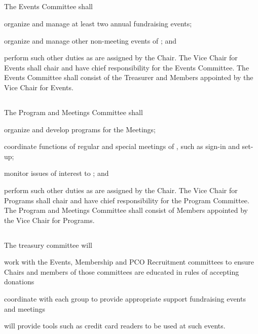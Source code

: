 \subsection{} \label{events-committee}
The Events Committee shall
\begin{inlinealphalist}
    \item organize and manage at least two annual fundraising events;
    \item organize and manage other non-meeting events of \thedistrict{}; and
    \item perform such other duties as are assigned by the Chair. The Vice Chair for Events shall chair and have chief responsibility for the Events Committee. The Events Committee shall consist of the Treasurer and Members appointed by the Vice Chair for Events.
\end{inlinealphalist}

\subsection{} \label{meetings-committee}
The Program and Meetings Committee shall
\begin{inlinealphalist}
    \item organize and develop programs for the Meetings;
    \item coordinate functions of regular and special meetings of \thedistrict{}, such as sign-in and set-up;
    \item monitor issues of interest to \thedistrict{}; and
    \item perform such other duties as are assigned by the Chair. The Vice Chair for Programs shall chair and have chief responsibility for the Program Committee. The Program and Meetings Committee shall consist of Members appointed by the Vice Chair for Programs.
\end{inlinealphalist}

\subsection{}
The treasury committee will
\begin{inlinealphalist}
    \item work with the Events, Membership and PCO Recruitment committees to ensure Chairs and members of those committees are educated in rules of accepting donations
    \item coordinate with each group to provide appropriate support fundraising events and meetings
    \item will provide tools such as credit card readers to be used at such events.
\end{inlinealphalist}

